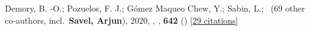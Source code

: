 \item[{\color{numcolor}\scriptsize1}] Demory, B. -O.; Pozuelos, F. J.; G{\'o}mez Maqueo Chew, Y.; Sabin, L.; \etal\ ({69} other co-authors, incl.\ \textbf{Savel, Arjun}), 2020, , \aanda, \textbf{642} () [\href{https://ui.adsabs.harvard.edu/abs/2020A&A...642A..49D}{29 citations}]